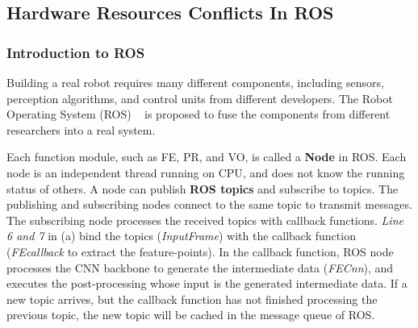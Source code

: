\subsection{Hardware Resources Conflicts In ROS}
\subsubsection{Introduction to ROS} Building a real robot requires many different components, including sensors, perception algorithms, and control units from different developers. The Robot Operating System (ROS)  ~\cite{quigley2009ros} is proposed to fuse the components from different researchers into a real system.

Each function module, such as FE, PR, and VO, is called a \textbf{Node} in ROS. Each node is an independent thread running on CPU, and does not know the running status of others. 
A node can publish \textbf{ROS topics} and subscribe to topics. The publishing and subscribing nodes connect to the same topic to transmit messages.
The subscribing node processes the received topics with callback functions. \textit{Line 6 and 7} in (a) bind the topics (\textit{InputFrame}) with the callback function (\textit{FEcallback} to extract the feature-points). In the callback function, ROS node processes the CNN backbone to generate the intermediate data (\textit{FECnn}), and executes the post-processing whose input is the generated intermediate data. If a new topic arrives, but the callback function has not finished processing the previous topic, the new topic will be cached in the message queue of ROS.






